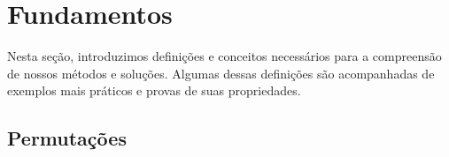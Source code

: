 \chapter{Fundamentos}
\label{fundamentos}
Nesta seção, introduzimos definições e conceitos necessários para a compreensão de nossos métodos e soluções. Algumas dessas definições são acompanhadas de exemplos mais práticos e provas de suas propriedades.

\section{Permutações}


